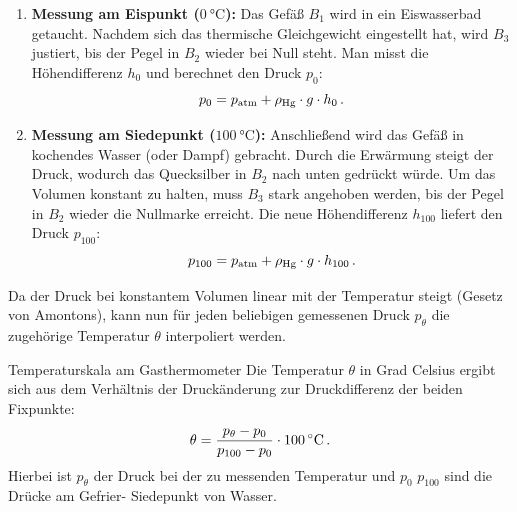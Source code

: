 \begin{enumerate}
    \item \textbf{Messung am Eispunkt ($\SI{0}{\celsius}$):}
    Das Gefäß $B_1$ wird in ein Eiswasserbad getaucht. Nachdem sich das thermische Gleichgewicht eingestellt hat, wird $B_3$ justiert, bis der Pegel in $B_2$ wieder bei Null steht. Man misst die Höhendifferenz $h_0$ und berechnet den Druck $p_0$:
    \begin{equation}
        p_0 = p_{\mathrm{atm}} + \rho_{\text{Hg}} \cdot g \cdot h_0 \,.
    \end{equation}
    
    \item \textbf{Messung am Siedepunkt ($\SI{100}{\celsius}$):}
    Anschließend wird das Gefäß in kochendes Wasser (oder Dampf) gebracht. Durch die Erwärmung steigt der Druck, wodurch das Quecksilber in $B_2$ nach unten gedrückt würde. Um das Volumen konstant zu halten, muss $B_3$ stark angehoben werden, bis der Pegel in $B_2$ wieder die Nullmarke erreicht. Die neue Höhendifferenz $h_{100}$ liefert den Druck $p_{100}$:
    \begin{equation}
        p_{100} = p_{\mathrm{atm}} + \rho_{\text{Hg}} \cdot g \cdot h_{100} \,.
    \end{equation}
\end{enumerate}

Da der Druck bei konstantem Volumen linear mit der Temperatur steigt (Gesetz von Amontons), kann nun für jeden beliebigen gemessenen Druck $p_\theta$ die zugehörige Temperatur $\theta$ interpoliert werden.

\begin{rememberbox}{Temperaturskala am Gasthermometer}
    Die Temperatur $\theta$ in Grad Celsius ergibt sich aus dem Verhältnis der Druckänderung zur Druckdifferenz der beiden Fixpunkte:
    \begin{equation}\label{eq: formel_gasthermometer_celsius}
        \theta = \frac{p_\theta - p_0}{p_{100} - p_0} \cdot \SI{100}{\celsius} \,.
    \end{equation}
    Hierbei ist $p_\theta$ der Druck bei der zu messenden Temperatur und $p_0$ \bzw $p_{100}$ sind die Drücke am Gefrier- \bzw Siedepunkt von Wasser.
\end{rememberbox}

